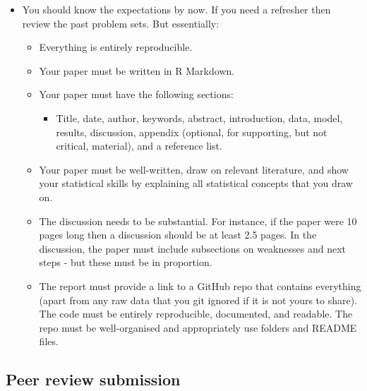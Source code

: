 \documentclass[
]{book}
\providecommand{\tightlist}{%
  \setlength{\itemsep}{0pt}\setlength{\parskip}{0pt}}
\begin{document}
\begin{itemize}
\tightlist
\item
  You should know the expectations by now. If you need a refresher then review the past problem sets. But essentially:

  \begin{itemize}
  \tightlist
  \item
    Everything is entirely reproducible.
  \item
    Your paper must be written in R Markdown.
  \item
    Your paper must have the following sections:

    \begin{itemize}
    \tightlist
    \item
      Title, date, author, keywords, abstract, introduction, data, model, results, discussion, appendix (optional, for supporting, but not critical, material), and a reference list.
    \end{itemize}
  \item
    Your paper must be well-written, draw on relevant literature, and show your statistical skills by explaining all statistical concepts that you draw on.
  \item
    The discussion needs to be substantial. For instance, if the paper were 10 pages long then a discussion should be at least 2.5 pages. In the discussion, the paper must include subsections on weaknesses and next steps - but these must be in proportion.
  \item
    The report must provide a link to a GitHub repo that contains everything (apart from any raw data that you git ignored if it is not yours to share). The code must be entirely reproducible, documented, and readable. The repo must be well-organised and appropriately use folders and README files.
  \end{itemize}
\end{itemize}

\hypertarget{peer-review-submission}{%
\subsection{Peer review submission}\label{peer-review-submission}}
\end{document}

